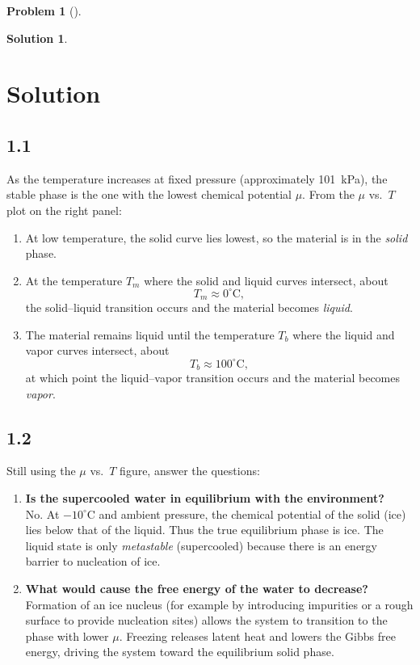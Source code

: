 \documentclass[12pt]{article}
\title{}
\author{Jerich Lee}
\date{\today}
\theoremstyle{definition} %
\newtheorem{solution}{Solution}
\newtheorem{problem}{Problem}
\theoremstyle{plain} %
\begin{document}
\maketitle
\begin{problem}[]
  
\end{problem}
\begin{solution}
  \section*{Solution}

  \subsection*{1.1}
  As the temperature increases at fixed pressure (approximately 101 kPa), the stable phase is the one with the lowest chemical potential \(\mu\). From the \(\mu\) vs.\ \(T\) plot on the right panel:
  \begin{enumerate}[label=(\arabic*)]
    \item At low temperature, the solid curve lies lowest, so the material is in the \emph{solid} phase.
    \item At the temperature \(T_m\) where the solid and liquid curves intersect, about 
      \[
        T_m \approx 0^\circ\mathrm{C},
      \]
      the solid–liquid transition occurs and the material becomes \emph{liquid}.
    \item The material remains liquid until the temperature \(T_b\) where the liquid and vapor curves intersect, about
      \[
        T_b \approx 100^\circ\mathrm{C},
      \]
      at which point the liquid–vapor transition occurs and the material becomes \emph{vapor}.
  \end{enumerate}
  
  \subsection*{1.2}
  Still using the \(\mu\) vs.\ \(T\) figure, answer the questions:
  \begin{enumerate}[label=(\alph*)]
    \item \textbf{Is the supercooled water in equilibrium with the environment?}\\
      No.  At \(-10^\circ\mathrm{C}\) and ambient pressure, the chemical potential of the solid (ice) lies below that of the liquid.  Thus the true equilibrium phase is ice.  The liquid state is only \emph{metastable} (supercooled) because there is an energy barrier to nucleation of ice.
    \item \textbf{What would cause the free energy of the water to decrease?}\\
      Formation of an ice nucleus (for example by introducing impurities or a rough surface to provide nucleation sites) allows the system to transition to the phase with lower \(\mu\).  Freezing releases latent heat and lowers the Gibbs free energy, driving the system toward the equilibrium solid phase.
  \end{enumerate} 
\end{solution}
\end{document}
